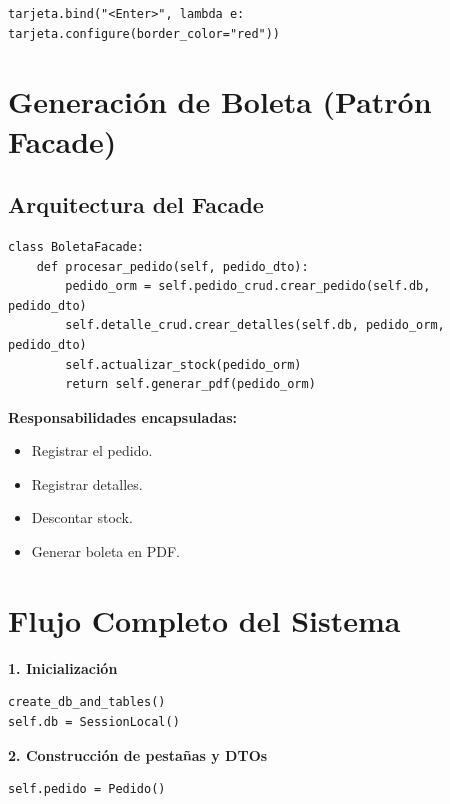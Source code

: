 \documentclass[11pt,letterpaper]{article}
\begin{document}
\begin{verbatim}
tarjeta.bind("<Enter>", lambda e: tarjeta.configure(border_color="red"))
\end{verbatim}

\section{Generación de Boleta (Patrón Facade)}

\subsection{Arquitectura del Facade}

\begin{verbatim}
class BoletaFacade:
    def procesar_pedido(self, pedido_dto):
        pedido_orm = self.pedido_crud.crear_pedido(self.db, pedido_dto)
        self.detalle_crud.crear_detalles(self.db, pedido_orm, pedido_dto)
        self.actualizar_stock(pedido_orm)
        return self.generar_pdf(pedido_orm)
\end{verbatim}

\textbf{Responsabilidades encapsuladas:}

\begin{itemize}
    \item Registrar el pedido.
    \item Registrar detalles.
    \item Descontar stock.
    \item Generar boleta en PDF.
\end{itemize}

\section{Flujo Completo del Sistema}

\textbf{1. Inicialización}

\begin{verbatim}
create_db_and_tables()
self.db = SessionLocal()
\end{verbatim}

\textbf{2. Construcción de pestañas y DTOs}

\begin{verbatim}
self.pedido = Pedido()
\end{verbatim}
\end{document}
